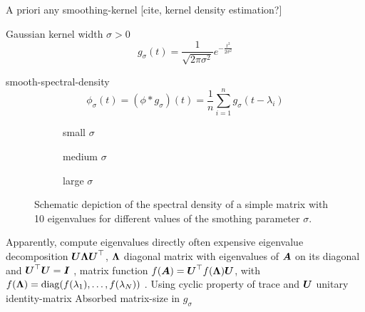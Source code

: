 A priori any \gls{smoothing-kernel} [cite, kernel density estimation?]

Gaussian kernel width $\sigma > 0$
\begin{equation}
    g_{\sigma}(t) = \frac{1}{\sqrt{2 \pi \sigma^2}} e^{-\frac{t^2}{2\sigma^2}}
    \label{equ:1-introduction-def-gaussian-kernel}
\end{equation}

\gls{smooth-spectral-density}
\begin{equation}
    \phi_{\sigma}(t) = (\phi \ast g_{\sigma})(t) = \frac{1}{n} \sum_{i=1}^{n} g_{\sigma}(t - \lambda_i)
    \label{equ:1-introduction-def-smooth-spectral-density}
\end{equation}

\begin{figure}[ht]
    \begin{subfigure}[b]{0.33\columnwidth}
        
        \caption{small $\sigma$}
        \label{fig:1-introduction-spectral-density-example-0.01}
    \end{subfigure}
    \begin{subfigure}[b]{0.33\columnwidth}
        
        \caption{medium $\sigma$}
        \label{fig:1-introduction-spectral-density-example-0.02}
    \end{subfigure}
    \begin{subfigure}[b]{0.33\columnwidth}
        
        \caption{large $\sigma$}
        \label{fig:1-introduction-spectral-density-example-0.05}
    \end{subfigure}
    \caption{Schematic depiction of the spectral density of a simple matrix with
    10 eigenvalues for different values of the smothing parameter $\sigma$.}
    \label{fig:1-introduction-smoothened-spectral-density}
\end{figure}

Apparently, compute eigenvalues directly often expensive
eigenvalue decomposition $\boldsymbol{U} \boldsymbol{\Lambda} \boldsymbol{U}^{\top}$,
$\boldsymbol{\Lambda}$ diagonal matrix with eigenvalues of $\boldsymbol{A}$ on its diagonal and $\boldsymbol{U}^{\top} \boldsymbol{U} = \boldsymbol{I}$ \cite[Theorem~4.1.5]{horn1985matrix},
matrix function $f(\boldsymbol{A}) = \boldsymbol{U}^{\top} f(\boldsymbol{\Lambda}) \boldsymbol{U}$,
with $f(\boldsymbol{\Lambda}) = \operatorname{diag}(f(\lambda_1), \dots, f(\lambda_N))$ \cite[Definition~1.2]{higham2008functions}.
Using cyclic property of trace and $\boldsymbol{U}$ unitary
\gls{identity-matrix}
Absorbed \gls{matrix-size} in $g_{\sigma}$

